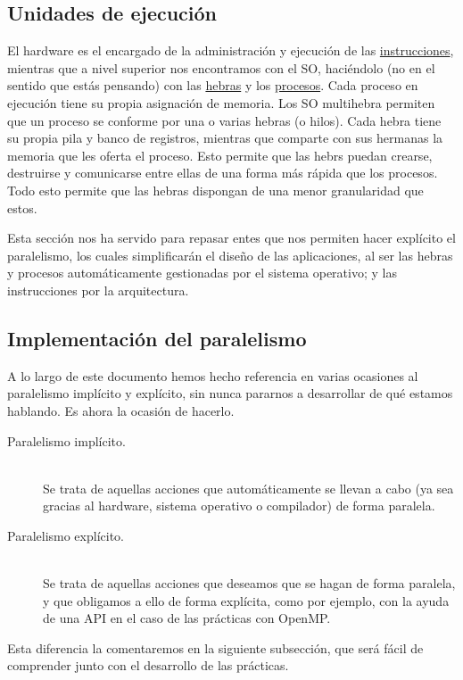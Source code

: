 \subsection{Unidades de ejecución}
El hardware es el encargado de la administración y ejecución de las \ul{instrucciones}, mientras que a nivel superior nos encontramos con el SO, haciéndolo (no en el sentido que estás pensando) con las \ul{hebras} y los \ul{procesos}. Cada proceso en ejecución tiene su propia asignación de memoria. Los SO multihebra permiten que un proceso se conforme por una o varias hebras (o hilos). Cada hebra tiene su propia pila y banco de registros, mientras que comparte con sus hermanas la memoria que les oferta el proceso. Esto permite que las hebrs puedan crearse, destruirse y comunicarse entre ellas de una forma más rápida que los procesos. Todo esto permite que las hebras dispongan de una menor granularidad que estos. 

Esta sección nos ha servido para repasar entes que nos permiten hacer explícito el paralelismo, los cuales simplificarán el diseño de las aplicaciones, al ser las hebras y procesos automáticamente gestionadas por el sistema operativo; y las instrucciones por la arquitectura.

\subsection{Implementación del paralelismo}
A lo largo de este documento hemos hecho referencia en varias ocasiones al paralelismo implícito y explícito, sin nunca pararnos a desarrollar de qué estamos hablando. Es ahora la ocasión de hacerlo.
\begin{description}
    \item [Paralelismo implícito.]~\\
        Se trata de aquellas acciones que automáticamente se llevan a cabo (ya sea gracias al hardware, sistema operativo o compilador) de forma paralela.

    \item [Paralelismo explícito.]~\\
        Se trata de aquellas acciones que deseamos que se hagan de forma paralela, y que obligamos a ello de forma explícita, como por ejemplo, con la ayuda de una API en el caso de las prácticas con OpenMP.
\end{description}
Esta diferencia la comentaremos en la siguiente subsección, que será fácil de comprender junto con el desarrollo de las prácticas.

